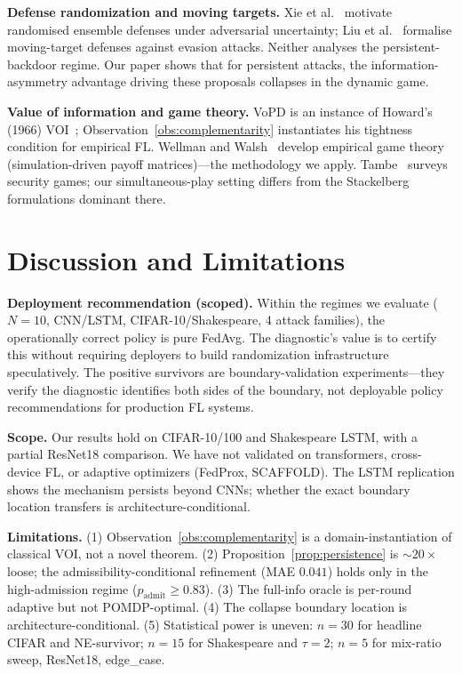 \documentclass{article}
\begin{document}
\textbf{Defense randomization and moving targets.} Xie et al.~\citep{xie2018mitigating} motivate randomised ensemble defenses under adversarial uncertainty; Liu et al.~\citep{liu2018towards} formalise moving-target defenses against evasion attacks. Neither analyses the persistent-backdoor regime. Our paper shows that for persistent attacks, the information-asymmetry advantage driving these proposals collapses in the dynamic game.

\textbf{Value of information and game theory.} VoPD is an instance of Howard's (1966) VOI~\citep{howard1966information}; Observation~\ref{obs:complementarity} instantiates his tightness condition for empirical FL. Wellman and Walsh~\citep{wellman2006methods,walsh2002analyzing} develop empirical game theory (simulation-driven payoff matrices)---the methodology we apply. Tambe~\citep{tambe2011security} surveys security games; our simultaneous-play setting differs from the Stackelberg formulations dominant there.

\section{Discussion and Limitations}
\label{sec:discussion}

\textbf{Deployment recommendation (scoped).} Within the regimes we evaluate ($N{=}10$, CNN/LSTM, CIFAR-10/Shakespeare, 4 attack families), the operationally correct policy is pure FedAvg. The diagnostic's value is to certify this without requiring deployers to build randomization infrastructure speculatively. The positive survivors are boundary-validation experiments---they verify the diagnostic identifies both sides of the boundary, not deployable policy recommendations for production FL systems.

\textbf{Scope.} Our results hold on CIFAR-10/100 and Shakespeare LSTM, with a partial ResNet18 comparison. We have not validated on transformers, cross-device FL, or adaptive optimizers (FedProx, SCAFFOLD). The LSTM replication shows the mechanism persists beyond CNNs; whether the exact boundary location transfers is architecture-conditional.

\textbf{Limitations.} (1) Observation~\ref{obs:complementarity} is a domain-instantiation of classical VOI, not a novel theorem. (2) Proposition~\ref{prop:persistence} is $\sim 20\times$ loose; the admissibility-conditional refinement (MAE $0.041$) holds only in the high-admission regime ($p_{\text{admit}} \geq 0.83$). (3) The full-info oracle is per-round adaptive but not POMDP-optimal. (4) The collapse boundary location is architecture-conditional. (5) Statistical power is uneven: $n=30$ for headline CIFAR and NE-survivor; $n=15$ for Shakespeare and $\tau{=}2$; $n=5$ for mix-ratio sweep, ResNet18, edge\_case.
\end{document}
